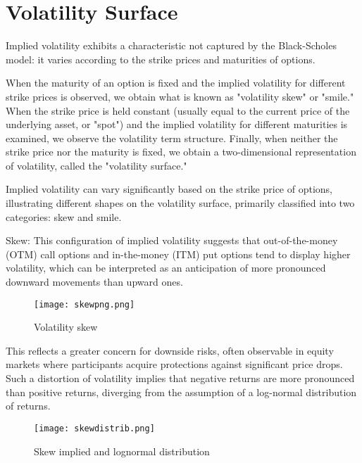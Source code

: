 \documentclass[a4paper,10pt]{article}
\begin{document}
\section{Volatility Surface}

Implied volatility exhibits a characteristic not captured by the Black-Scholes model: it varies according to the strike prices and maturities of options.\newline

When the maturity of an option is fixed and the implied volatility for different strike prices is observed, we obtain what is known as "volatility skew" or "smile." When the strike price is held constant (usually equal to the current price of the underlying asset, or "spot") and the implied volatility for different maturities is examined, we observe the volatility term structure. Finally, when neither the strike price nor the maturity is fixed, we obtain a two-dimensional representation of volatility, called the "volatility surface."\newline

Implied volatility can vary significantly based on the strike price of options, illustrating different shapes on the volatility surface, primarily classified into two categories: skew and smile.\newline

Skew: This configuration of implied volatility suggests that out-of-the-money (OTM) call options and in-the-money (ITM) put options tend to display higher volatility, which can be interpreted as an anticipation of more pronounced downward movements than upward ones. 

\begin{figure}[htbp]
    \centering
    \texttt{[image: skewpng.png]}
    \caption{Volatility skew}
    \label{fig:skew}
\end{figure}

This reflects a greater concern for downside risks, often observable in equity markets where participants acquire protections against significant price drops. Such a distortion of volatility implies that negative returns are more pronounced than positive returns, diverging from the assumption of a log-normal distribution of returns.\newline

\begin{figure}[htbp]
    \centering
    \texttt{[image: skewdistrib.png]}
    \caption{Skew implied and lognormal distribution}
    \label{fig:skewdistrib}
\end{figure}
\end{document}
